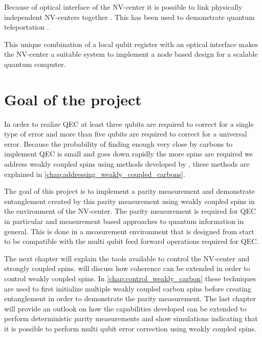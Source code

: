 Because of optical interface of the NV-center it is possible to link physically independent NV-centers together \citep{Bernien2013Heralded}. This has been used to demonstrate quantum teleportation \citep{Pfaff2014Unconditional}.

This unique combination of a local qubit register with an optical interface makes the NV-center a suitable system to implement a node based design for a scalable quantum computer\citep{Nickerson2013Topological}.

\section{Goal of the project}
In order to realize QEC at least three qubits are required to correct for a single type of error and more than five qubits are required to correct for a universal error.
Because the probability of finding enough very close by carbons to implement QEC is small and goes down rapidly the more spins are required \citep{Waldherr2014Quantum,Taminiau2014Universal} we address weakly coupled spins using methods developed by \citet{Taminiau2012Detection,Taminiau2014Universal}, these methods are explained in \cref{chap:addressing_weakly_coupled_carbons}.

The goal of this project is to implement  a parity measurement and demonstrate entanglement created by this parity measurement using weakly coupled spins in the environment of the NV-center.
The parity measurement is required for QEC in particular and measurement based approaches to quantum information in general.
This is done in a measurement environment that is designed from start to be compatible with the multi qubit feed forward operations required for QEC.

The next chapter will explain the tools available to control the NV-center and strongly coupled spins.
 will discuss how coherence can be extended in order to control weakly coupled spins.
In \cref{chap:control_weakly_carbon} these techniques are used to first initialize multiple weakly coupled carbon spins before creating entanglement in order to demonstrate the parity measurement.
The last chapter will provide an outlook on how the capabilities developed can be extended to perform deterministic parity measurements and show simulations indicating that it is possible to perform multi qubit error correction using weakly coupled spins.
